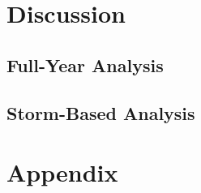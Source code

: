 \documentclass[11pt,a4paper]{article}
\begin{document}
\newpage

\section{Discussion}
\subsection{Full-Year Analysis}


\subsection{Storm-Based Analysis}

\newpage
{}



\newpage
\section*{Appendix}


\end{document}
